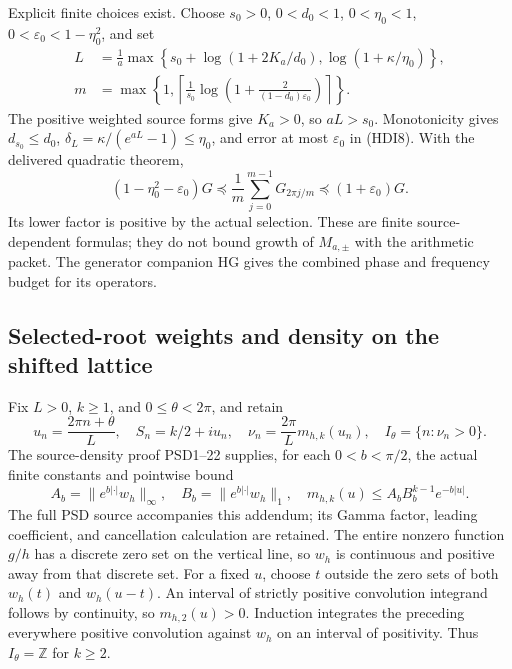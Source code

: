 Explicit finite choices exist. Choose \(s_0>0\), \(0<d_0<1\),
\(0<\eta_0<1\), \(0<\varepsilon_0<1-\eta_0^2\), and set
\[
 \begin{split}
 L&=\frac1a\max\left\{s_0+\log(1+2K_a/d_0),
                         \log(1+\kappa/\eta_0)\right\},\\
 m&=\max\left\{1,\left\lceil\frac1{s_0}
 \log\left(1+\frac{2}{(1-d_0)\varepsilon_0}\right)\right\rceil\right\}.
 \end{split}
 \tag{HDI9}
\]
The positive weighted source forms give \(K_a>0\), so \(aL>s_0\).
Monotonicity gives \(d_{s_0}\le d_0\),
\(\delta_L=\kappa/(e^{aL}-1)\le\eta_0\), and error at most
\(\varepsilon_0\) in (HDI8). With the delivered quadratic theorem,
\[
 (1-\eta_0^2-\varepsilon_0)G
 \preceq \frac1m\sum_{j=0}^{m-1}G_{2\pi j/m}
 \preceq(1+\varepsilon_0)G.
 \tag{HDI10}
\]
Its lower factor is positive by the actual selection. These are
finite source-dependent formulas; they do not bound growth of
\(M_{a,\pm}\) with the arithmetic packet. The generator companion
HG gives the combined phase and frequency budget for its operators.

\subsection{Selected-root weights and density on the shifted lattice}
Fix \(L>0\), \(k\ge1\), and \(0\le\theta<2\pi\), and retain
\[
 u_n=\frac{2\pi n+\theta}{L},\quad S_n=k/2+iu_n,\quad
 \nu_n=\frac{2\pi}{L}m_{h,k}(u_n),\quad
 I_\theta=\{n:\nu_n>0\}.
 \tag{HDI11}
\]
The source-density proof PSD1--22 supplies, for each
\(0<b<\pi/2\), the actual finite constants and pointwise bound
\[
 A_b=\|e^{b|\cdot|}w_h\|_\infty,\quad
 B_b=\|e^{b|\cdot|}w_h\|_1,\quad
 m_{h,k}(u)\le A_bB_b^{k-1}e^{-b|u|}.
 \tag{HDI12}
\]
The full PSD source accompanies this addendum; its Gamma factor,
leading coefficient, and cancellation calculation are retained.
The entire nonzero function \(g/h\) has a discrete zero set on
the vertical line, so \(w_h\) is continuous and positive away
from that discrete set. For a fixed \(u\), choose \(t\) outside
the zero sets of both \(w_h(t)\) and \(w_h(u-t)\). An interval
of strictly positive convolution integrand follows by continuity,
so \(m_{h,2}(u)>0\). Induction integrates the preceding everywhere
positive convolution against \(w_h\) on an interval of positivity.
Thus \(I_\theta=\mathbb Z\) for \(k\ge2\).

